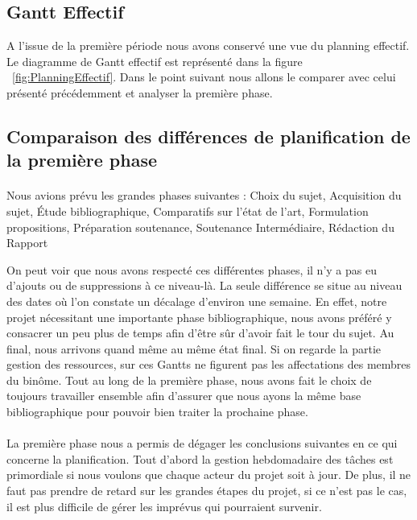 \documentclass[11pt, french]{report-rd-info}
\begin{document}
\subsection{Gantt Effectif}
A l'issue de la première période nous avons conservé une vue du planning effectif. Le diagramme de Gantt effectif est représenté dans la figure ~\ref{fig:PlanningEffectif}. Dans le point suivant nous allons le comparer avec celui présenté précédemment et analyser la première phase.

\subsection{Comparaison des différences de planification de la première phase}
\paragraph*{}
Nous avions prévu les grandes phases suivantes : Choix du sujet, Acquisition du sujet, Étude bibliographique, Comparatifs sur l'état de l'art, Formulation propositions, Préparation soutenance, Soutenance Intermédiaire, Rédaction du Rapport

On peut voir que nous avons respecté ces différentes phases, il n’y a pas eu d’ajouts ou de suppressions à ce niveau-là. La seule différence se situe au niveau des dates où l’on constate un décalage d’environ une semaine. En effet, notre projet nécessitant une importante phase bibliographique, nous avons préféré y consacrer un peu plus de temps afin d’être sûr d’avoir fait le tour du sujet. Au final, nous arrivons quand même au même état final. Si on regarde la partie gestion des ressources, sur ces Gantts ne figurent pas les affectations des membres du binôme. Tout au long de la première phase, nous avons fait le choix de toujours travailler ensemble afin d’assurer que nous ayons la même base bibliographique pour pouvoir bien traiter la prochaine phase.

\paragraph*{}
La première phase nous a permis de dégager les conclusions suivantes en ce qui concerne la planification. Tout d’abord la gestion hebdomadaire des tâches est primordiale si nous voulons que chaque acteur du projet soit à jour. De plus, il ne faut pas prendre de retard sur les grandes étapes du projet, si ce n'est pas le cas, il est plus difficile de gérer les imprévus qui pourraient survenir. 
\end{document}
